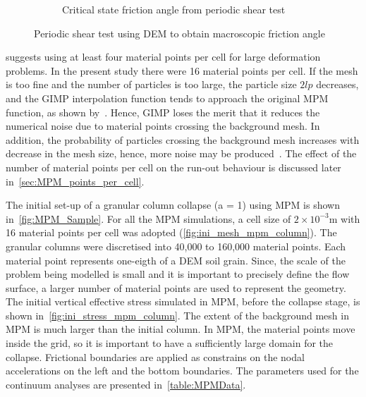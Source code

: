 \begin{figure}
\begin{subfigure}[b]{0.65\textwidth}
\caption{Critical state friction angle from periodic shear test}
\label{fig:Sxy_vs_Syy}
\end{subfigure} 
\caption{Periodic shear test using DEM to obtain macroscopic friction angle}
\label{fig:shear_test}
\end{figure}

\citet{Guilkey2003} suggests using at least four material points per cell for 
large deformation problems. In the present study there were 16 material points 
per cell. If the mesh is too fine and the number of particles is too 
large, the particle size $2lp$ decreases, and the GIMP interpolation 
function tends to approach the original MPM function, as shown 
by~\citet{Bardenhagen2004}. Hence, GIMP loses the merit that it reduces the 
numerical noise due to material points crossing the background mesh. In 
addition, the probability of particles crossing the background mesh increases 
with decrease in the mesh size, hence, more noise may be 
produced~\citep{Abe2013}. The effect of the number of material points per cell 
on the run-out behaviour is discussed later in~\cref{sec:MPM_points_per_cell}.

The initial set-up of a granular column collapse (a = 1) using MPM is shown 
in~\cref{fig:MPM_Sample}. For all the MPM simulations, a cell size of 
$2\times10^{-3}\si{\m}$ with 16 material points per cell was adopted 
(\cref{fig:ini_mesh_mpm_column}). The granular columns were
discretised into 40,000 to 160,000 material points. Each material point 
represents one-eigth of a DEM soil grain. Since, the scale of the problem being 
modelled is small and it is important to precisely define the flow surface, a 
larger number of material points are used to represent the geometry. The 
initial vertical effective stress simulated in MPM, before the collapse stage, 
is shown in~\cref{fig:ini_stress_mpm_column}. The extent of the 
background mesh in MPM is much larger than the initial column. In MPM, the 
material points move inside the grid, so it is important to have a sufficiently 
large domain for the collapse. Frictional boundaries are applied as constrains 
on the nodal accelerations on the left and the bottom boundaries. The 
parameters used for the continuum analyses are presented 
in~\cref{table:MPMData}. 

